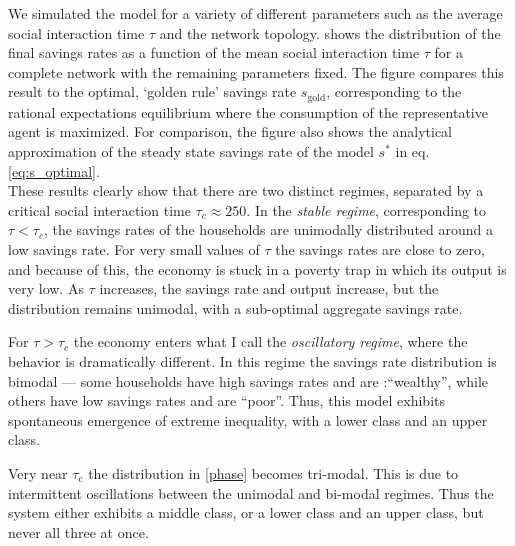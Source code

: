 We simulated the model for a variety of different parameters such as the average social interaction time $\tau$ and the network topology.  shows the distribution of the final savings rates as a function of the mean social interaction time $\tau$ for a complete network with the remaining parameters fixed.  The figure compares this result to the optimal, `golden rule' savings rate $s_\mathrm{gold}$,  corresponding to the rational expectations equilibrium where the consumption of the representative agent is maximized. For comparison, the figure also shows the analytical approximation of the steady state savings rate of the model $s^*$ in eq. \eqref{eq:s_optimal}.\\

These results clearly show that there are two distinct regimes, separated by a critical social interaction time $\tau_{c} \approx 250$.
In the \emph{stable regime}, corresponding to $\tau < \tau_{c}$, the savings rates of the households are unimodally distributed around a low savings rate.  For very small values of $\tau$ the savings rates are close to zero, and because of this, the economy is stuck in a poverty trap in which its output is very low.  As $\tau$ increases, the savings rate and output increase, but the distribution remains unimodal, with a sub-optimal aggregate savings rate.

For $\tau \! > \! \tau_{c}$ the economy enters what I call the \emph{ oscillatory regime}, where the behavior is dramatically different. In this regime the savings rate distribution is bimodal --- some households have high savings rates and are :``wealthy'', while others have low savings rates and are ``poor''.  Thus, this model exhibits spontaneous emergence of extreme inequality, with a lower class and an upper class.

Very near $\tau_\mathrm{c}$ the distribution in \cref{phase} becomes tri-modal. This is due to intermittent oscillations between the unimodal and bi-modal regimes. Thus the system either exhibits a middle class, or a lower class and an upper class, but never all three at once.

